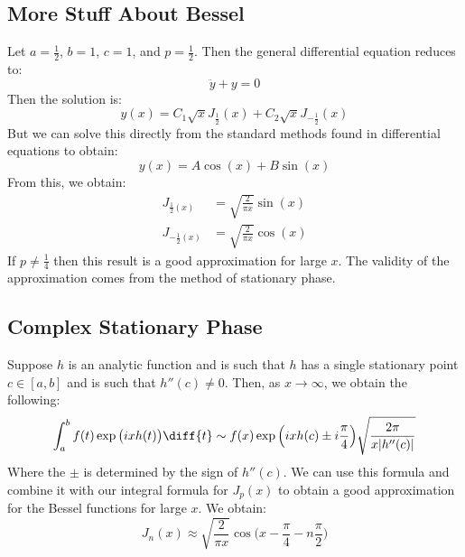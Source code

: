         \subsection{More Stuff About Bessel}
            Let $a=\frac{1}{2}$, $b=1$, $c=1$,
            and $p=\frac{1}{2}$. Then the general differential
            equation reduces to:
            \begin{equation}
                \ddot{y}+y=0
            \end{equation}
            Then the solution is:
            \begin{equation}
                y(x)=C_{1}\sqrt{x}J_{\frac{1}{2}}(x)+
                    C_{2}\sqrt{x}J_{\minus\frac{1}{2}}(x)
            \end{equation}
            But we can solve this directly from the standard
            methods found in differential equations to obtain:
            \begin{equation}
                y(x)=A\cos(x)+B\sin(x)
            \end{equation}
            From this, we obtain:
            \begin{align}
                J_{\frac{1}{2}(x)}
                    &=\sqrt{\frac{2}{\pi{x}}}\sin(x)\\
                J_{\minus\frac{1}{2}(x)}
                    &=\sqrt{\frac{2}{\pi{x}}}\cos(x)
            \end{align}
            If $p\ne\frac{1}{4}$ then this result is a good
            approximation for large $x$. The validity of the
            approximation comes from the method of stationary
            phase.
        \subsection{Complex Stationary Phase}
            Suppose $h$ is an analytic function and is such
            that $h$ has a single stationary point
            $c\in[a,b]$ and is such that $h''(c)\ne{0}$.
            Then, as $x\rightarrow\infty$, we obtain the following:
            \begin{equation}
                \int_{a}^{b}f(t)\exp\big(ixh(t)\big)\diff{t}
                \sim{f}(x)\exp\Big(ixh(c)\pm{i}\frac{\pi}{4}\Big)
                    \sqrt{\frac{2\pi}{x|h''(c)|}}
            \end{equation}
            Where the $\pm$ is determined by the sign of
            $h''(c)$. We can use this formula and combine it with
            our integral formula for $J_{p}(x)$ to obtain a good
            approximation for the Bessel functions for large $x$.
            We obtain:
            \begin{equation}
                J_{n}(x)\approx
                \sqrt{\frac{2}{\pi{x}}}
                \cos\Big(x-\frac{\pi}{4}-n\frac{\pi}{2}\Big)
            \end{equation}
